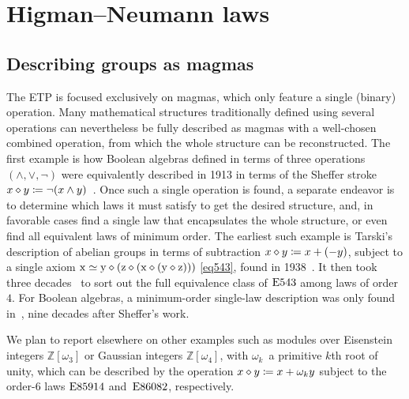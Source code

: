 \section{Higman--Neumann laws}\label{higman-neumann}

\subsection{Describing groups as magmas}

The ETP is focused exclusively on magmas, which only feature a single (binary) operation.  Many mathematical structures traditionally defined using several operations can nevertheless be fully described as magmas with a well-chosen combined operation, from which the whole structure can be reconstructed.  The first example is how Boolean algebras defined in terms of three operations $(\land,\lor,\lnot)$ were equivalently described in 1913 in terms of the Sheffer stroke $x\diamond y\coloneqq \lnot(x\land y)$~\cite{sheffer}.  Once such a single operation is found, a separate endeavor is to determine which laws it must satisfy to get the desired structure, and, in favorable cases find a single law that encapsulates the whole structure, or even find all equivalent laws of minimum order.  The earliest such example is Tarski's description of abelian groups in terms of subtraction $x\diamond y\coloneqq x+(-y)$, subject to a single axiom $\mathrm{x} \simeq \mathrm{y} \diamond (\mathrm{z} \diamond (\mathrm{x} \diamond (\mathrm{y} \diamond \mathrm{z})))$ \eqref{eq543}, found in 1938~\cite{Tarski1938}.  It then took three decades~\cite{higman-neumann,Sholander01021959,Padmanabhan_1969} to sort out the full equivalence class of $\mathrm{E}543$ among laws of order~$4$.  For Boolean algebras, a minimum-order single-law description was only found in~\cite{mccune_et_al}, nine decades after Sheffer's work.

We plan to report elsewhere on other examples such as modules over Eisenstein integers $\mathbb{Z}[\omega_3]$ or Gaussian integers $\mathbb{Z}[\omega_4]$, with $\omega_k$~a primitive $k$th root of unity, which can be described by the operation $x \diamond y \coloneqq x + \omega_k y$ subject to the order-$6$ laws $\mathrm{E}85914$ and~$\mathrm{E}86082$, respectively.

